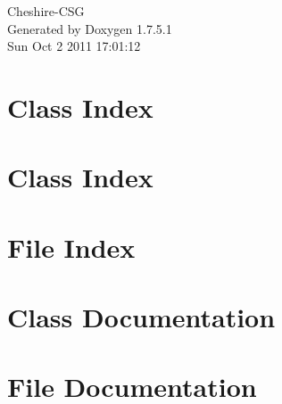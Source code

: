 \documentclass[a4paper]{book}
\begin{document}
\hypersetup{pageanchor=false,citecolor=blue}
\begin{titlepage}
\vspace*{7cm}
\begin{center}
{\Large \-Cheshire-\/\-C\-S\-G }\\
\vspace*{1cm}
{\large \-Generated by Doxygen 1.7.5.1}\\
\vspace*{0.5cm}
{\small Sun Oct 2 2011 17:01:12}\\
\end{center}
\end{titlepage}
\clearemptydoublepage
{}
\tableofcontents
\clearemptydoublepage
{}
\hypersetup{pageanchor=true,citecolor=blue}
\chapter{\-Class \-Index}

\chapter{\-Class \-Index}

\chapter{\-File \-Index}

\chapter{\-Class \-Documentation}

















\chapter{\-File \-Documentation}

















\printindex
\end{document}
